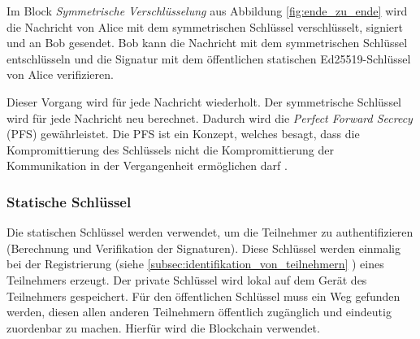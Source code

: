 Im Block \textit{Symmetrische Verschlüsselung} aus Abbildung \ref{fig:ende_zu_ende} wird die Nachricht von Alice mit dem symmetrischen Schlüssel verschlüsselt, signiert und an Bob gesendet. Bob kann die Nachricht mit dem symmetrischen Schlüssel entschlüsseln und die Signatur mit dem öffentlichen statischen Ed25519-Schlüssel von Alice verifizieren.

Dieser Vorgang wird für jede Nachricht wiederholt. Der symmetrische Schlüssel wird für jede Nachricht neu berechnet. Dadurch wird die \textit{Perfect Forward Secrecy} (PFS) gewährleistet. Die PFS ist ein Konzept, welches besagt, dass die Kompromittierung des Schlüssels nicht die Kompromittierung der Kommunikation in der Vergangenheit ermöglichen darf \parencite[S. 921-922]{Krawczyk_PerfectForwardSecrecy}.


\subsubsection{Statische Schlüssel}

Die statischen Schlüssel werden verwendet, um die Teilnehmer zu authentifizieren (Berechnung und Verifikation der Signaturen). Diese Schlüssel werden einmalig bei der Registrierung (siehe \ref{subsec:identifikation_von_teilnehmern} \textit{}) eines Teilnehmers erzeugt. Der private Schlüssel wird lokal auf dem Gerät des Teilnehmers gespeichert. Für den öffentlichen Schlüssel muss ein Weg gefunden werden, diesen allen anderen Teilnehmern öffentlich zugänglich und eindeutig zuordenbar zu machen. Hierfür wird die Blockchain verwendet. 


